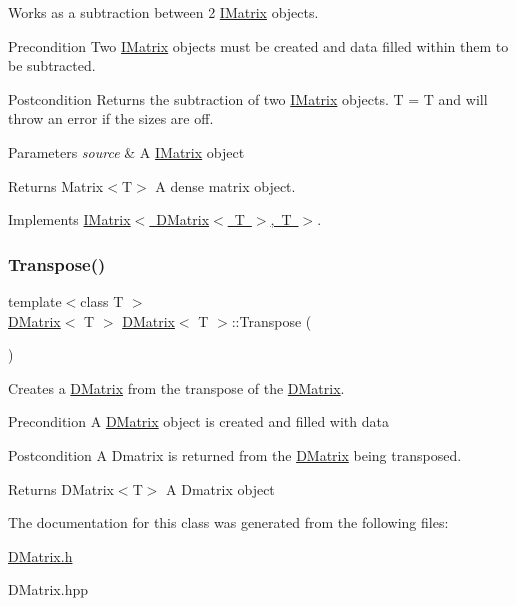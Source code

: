 Works as a subtraction between 2 \mbox{\hyperlink{class_i_matrix}{I\+Matrix}} objects. 

\begin{DoxyPrecond}{Precondition}
Two \mbox{\hyperlink{class_i_matrix}{I\+Matrix}} objects must be created and data filled within them to be subtracted. 
\end{DoxyPrecond}
\begin{DoxyPostcond}{Postcondition}
Returns the subtraction of two \mbox{\hyperlink{class_i_matrix}{I\+Matrix}} objects. T = T and will throw an error if the sizes are off.
\end{DoxyPostcond}

\begin{DoxyParams}{Parameters}
{\em source} & A \mbox{\hyperlink{class_i_matrix}{I\+Matrix}} object \\
\hline
\end{DoxyParams}
\begin{DoxyReturn}{Returns}
Matrix$<$\+T$>$ A dense matrix object. 
\end{DoxyReturn}


Implements \mbox{\hyperlink{class_i_matrix_a0bf5046efed75799656059ce2980a851}{I\+Matrix$<$ D\+Matrix$<$ T $>$, T $>$}}.

\mbox{\label{class_d_matrix_a51fca60c2fdadb5684fd076fbfeecacd}} 
\subsubsection{\texorpdfstring{Transpose()}{Transpose()}}
{\footnotesize\ttfamily template$<$class T $>$ \\
\mbox{\hyperlink{class_d_matrix}{D\+Matrix}}$<$ T $>$ \mbox{\hyperlink{class_d_matrix}{D\+Matrix}}$<$ T $>$\+::Transpose (\begin{DoxyParamCaption}{ }\end{DoxyParamCaption})}



Creates a \mbox{\hyperlink{class_d_matrix}{D\+Matrix}} from the transpose of the \mbox{\hyperlink{class_d_matrix}{D\+Matrix}}. 

\begin{DoxyPrecond}{Precondition}
A \mbox{\hyperlink{class_d_matrix}{D\+Matrix}} object is created and filled with data 
\end{DoxyPrecond}
\begin{DoxyPostcond}{Postcondition}
A Dmatrix is returned from the \mbox{\hyperlink{class_d_matrix}{D\+Matrix}} being transposed.
\end{DoxyPostcond}
\begin{DoxyReturn}{Returns}
D\+Matrix$<$\+T$>$ A Dmatrix object 
\end{DoxyReturn}


The documentation for this class was generated from the following files\+:\begin{DoxyCompactItemize}
\item 
\mbox{\hyperlink{_d_matrix_8h}{D\+Matrix.\+h}}\item 
D\+Matrix.\+hpp\end{DoxyCompactItemize}
